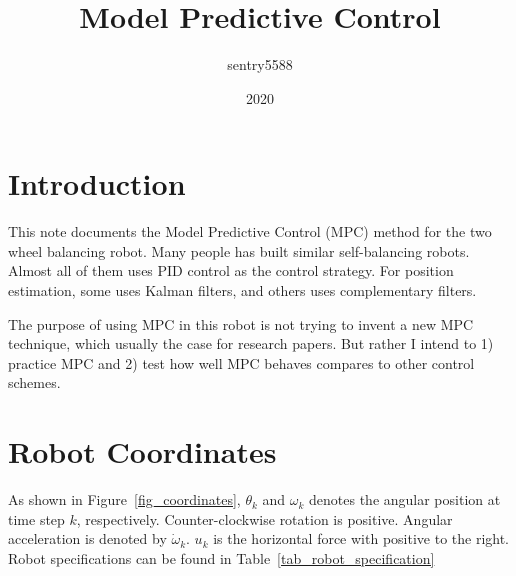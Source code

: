 \documentclass[12pt]{article}
\title{Model Predictive Control}
\date{2020}
\author{sentry5588}
\begin{document}
\pagecolor{lightgray}
\maketitle
\section{Introduction}
This note documents the Model Predictive Control (MPC) method for the two
wheel balancing robot. Many people has built similar self-balancing robots.
Almost all of them uses PID control as the control strategy. For position
estimation, some uses Kalman filters, and others uses complementary filters.

The purpose of using MPC in this robot is not trying to invent a new MPC
technique, which usually the case for research papers.
But rather I intend to 1) practice MPC and 2) test how well MPC behaves
compares to other control schemes.

\section{Robot Coordinates}
As shown in Figure~\ref{fig_coordinates}, $\theta_k$ and $\omega_k$ denotes 
the angular position at time step $k$, respectively.
Counter-clockwise rotation is positive. Angular acceleration is denoted
by $\dot{\omega}_k$.
$u_k$ is the horizontal force
with positive to the right. Robot specifications can be found in 
Table~\ref{tab_robot_specification}
\end{document}
